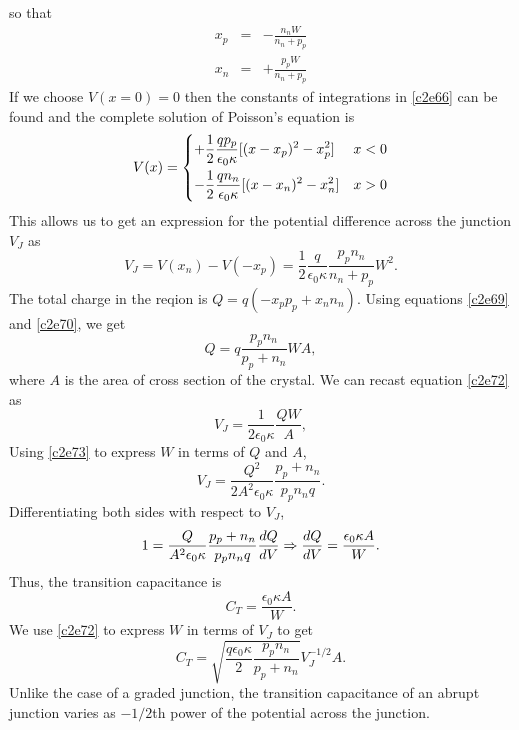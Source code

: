 so that
\begin{eqnarray}
x_p &=& -\frac{n_nW}{n_n + p_p} \label{c2e69} \\
x_n &=& +\frac{p_pW}{n_n + p_p} \label{c2e70}
\end{eqnarray}
If we choose $V(x = 0) = 0$ then the constants of integrations in \eqref{c2e66}
can be found and the complete solution of Poisson's equation is
\begin{equation}\label{c2e71}
V(x) = \begin{dcases}
+\frac{1}{2}\frac{qp_p}{\epsilon_0\kappa}[(x - x_p)^2 - x_p^2] & x < 0 \\
-\frac{1}{2}\frac{qn_n}{\epsilon_0\kappa}[(x - x_n)^2 - x_n^2] & x > 0
\end{dcases}
\end{equation}
This allows us to get an expression for the potential difference across the
junction $V_J$ as
\begin{equation}\label{c2e72}
V_J = V(x_n) - V(-x_p) = 
\frac{1}{2}\frac{q}{\epsilon_0\kappa}\frac{p_pn_n}{n_n+p_p}
W^2.
\end{equation}
The total charge in the reqion is $Q = q(-x_pp_p + x_nn_n)$. Using equations
\eqref{c2e69} and \eqref{c2e70}, we get
\begin{equation}\label{c2e73}
Q = q\frac{p_pn_n}{p_p + n_n}WA,
\end{equation}
where $A$ is the area of cross section of the crystal. We can recast equation
\eqref{c2e72} as
\begin{equation}\label{c2e74}
V_J = \frac{1}{2\epsilon_0\kappa}\frac{QW}{A},
\end{equation}
Using \eqref{c2e73} to express $W$ in terms of $Q$ and $A$,
\begin{equation}\label{c2e75}
V_J = \frac{Q^2}{2A^2\epsilon_0\kappa}\frac{p_p + n_n}{p_pn_nq}.
\end{equation}
Differentiating both sides with respect to $V_J$,
\[
1 = \frac{Q}{A^2\epsilon_0\kappa}\frac{p_p + n_n}{p_pn_nq}\frac{d{Q}}{d{V}} \Rightarrow
\frac{d{Q}}{d{V}} = \frac{\epsilon_0\kappa A}{W}.
\]
Thus, the transition capacitance is
\begin{equation}\label{c2e76}
C_T = \frac{\epsilon_0\kappa A}{W}.
\end{equation}
We use \eqref{c2e72} to express $W$ in terms of $V_J$ to get
\begin{equation}\label{c2e77}
C_T = \sqrt{\frac{q\epsilon_0\kappa}{2}\frac{p_pn_n}{p_p + n_n}}V_J^{-1/2}A.
\end{equation}
Unlike the case of a graded junction, the transition capacitance of an abrupt
junction varies as $-1/2$th power of the potential across the junction.

